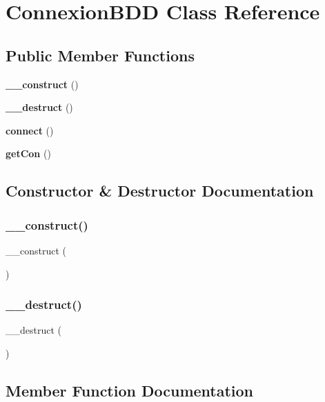 \section{Connexion\+B\+DD Class Reference}
\label{class_connexion_b_d_d}
\subsection*{Public Member Functions}
\begin{DoxyCompactItemize}
\item 
\textbf{ \+\_\+\+\_\+construct} ()
\item 
\textbf{ \+\_\+\+\_\+destruct} ()
\item 
\textbf{ connect} ()
\item 
\textbf{ get\+Con} ()
\end{DoxyCompactItemize}


\subsection{Constructor \& Destructor Documentation}
\mbox{\label{class_connexion_b_d_d_a095c5d389db211932136b53f25f39685}} 
\subsubsection{\+\_\+\+\_\+construct()}
{\footnotesize\ttfamily \+\_\+\+\_\+construct (\begin{DoxyParamCaption}{ }\end{DoxyParamCaption})}

\mbox{\label{class_connexion_b_d_d_a421831a265621325e1fdd19aace0c758}} 
\subsubsection{\+\_\+\+\_\+destruct()}
{\footnotesize\ttfamily \+\_\+\+\_\+destruct (\begin{DoxyParamCaption}{ }\end{DoxyParamCaption})}



\subsection{Member Function Documentation}
\mbox{\label{class_connexion_b_d_d_a78572828d11dcdf2a498497d9001d557}} 
